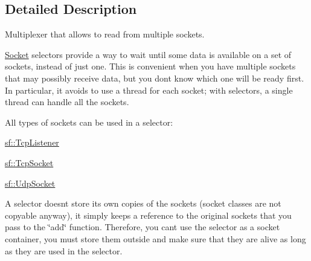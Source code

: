 \subsection{Detailed Description}
Multiplexer that allows to read from multiple sockets. 

\begin{DoxyVerb}\end{DoxyVerb}


\mbox{\hyperlink{classsf_1_1_socket}{Socket}} selectors provide a way to wait until some data is available on a set of sockets, instead of just one. This is convenient when you have multiple sockets that may possibly receive data, but you don\textquotesingle{}t know which one will be ready first. In particular, it avoids to use a thread for each socket; with selectors, a single thread can handle all the sockets.

All types of sockets can be used in a selector\+: \begin{DoxyItemize}
\item \mbox{\hyperlink{classsf_1_1_tcp_listener}{sf\+::\+Tcp\+Listener}} \item \mbox{\hyperlink{classsf_1_1_tcp_socket}{sf\+::\+Tcp\+Socket}} \item \mbox{\hyperlink{classsf_1_1_udp_socket}{sf\+::\+Udp\+Socket}}\end{DoxyItemize}
A selector doesn\textquotesingle{}t store its own copies of the sockets (socket classes are not copyable anyway), it simply keeps a reference to the original sockets that you pass to the \char`\"{}add\char`\"{} function. Therefore, you can\textquotesingle{}t use the selector as a socket container, you must store them outside and make sure that they are alive as long as they are used in the selector.

